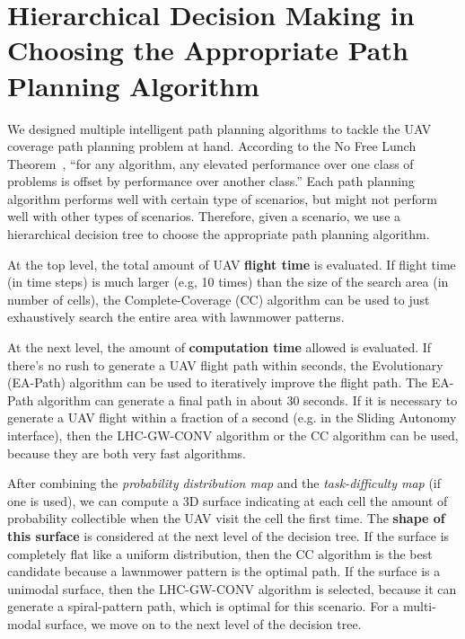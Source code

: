 \section{Hierarchical Decision Making in Choosing the Appropriate Path Planning Algorithm}
\label{Decision}

We designed multiple intelligent path planning algorithms to tackle the UAV coverage path planning problem at hand. According to the No Free Lunch Theorem~\cite{Wolpert1997No}, ``for any algorithm, any elevated performance over one class of problems is offset by performance over another class.'' Each path planning algorithm performs well with certain type of scenarios, but might not perform well with other types of scenarios. Therefore, given a scenario, we use a hierarchical decision tree to choose the appropriate path planning algorithm.

At the top level, the total amount of UAV \textbf{flight time} is evaluated. If flight time (in time steps) is much larger (e.g, 10 times) than the size of the search area (in number of cells), the Complete-Coverage (CC) algorithm can be used to just exhaustively search the entire area with lawnmower patterns.

At the next level, the amount of \textbf{computation time} allowed is evaluated. If there's no rush to generate a UAV flight path within seconds, the Evolutionary (EA-Path) algorithm can be used to iteratively improve the flight path. The EA-Path algorithm can generate a final path in about 30 seconds. If it is necessary to generate a UAV flight within a fraction of a second (e.g. in the Sliding Autonomy interface), then the LHC-GW-CONV algorithm or the CC algorithm can be used, because they are both very fast algorithms.

After combining the \textit{probability distribution map} and the \textit{task-difficulty map} (if one is used), we can compute a 3D surface indicating at each cell the amount of probability collectible when the UAV visit the cell the first time. The \textbf{shape of this surface} is considered at the next level of the decision tree. If the surface is completely flat like a uniform distribution, then the CC algorithm is the best candidate because a lawnmower pattern is the optimal path. If the surface is a unimodal surface, then the LHC-GW-CONV algorithm is selected, because it can generate a spiral-pattern path, which is optimal for this scenario. For a multi-modal surface, we move on to the next level of the decision tree.

